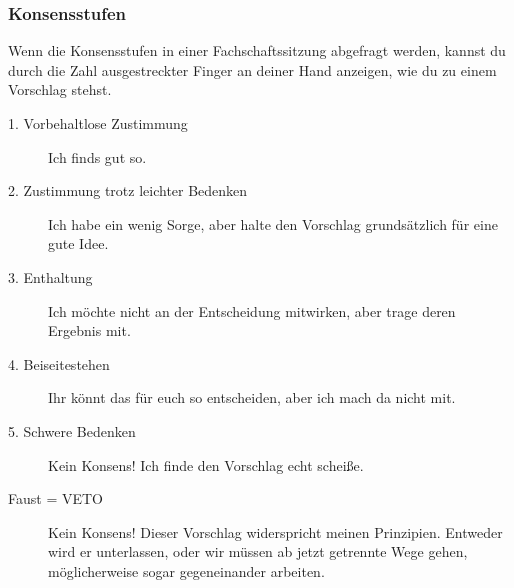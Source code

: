 \vspace*{-1em}

\subsubsection*{Konsensstufen}
\footnotesize
Wenn die Konsensstufen in einer Fachschaftssitzung abgefragt werden, kannst du durch die Zahl ausgestreckter Finger an deiner Hand anzeigen, wie du zu einem Vorschlag stehst.
\begin{description}
\item[1. Vorbehaltlose Zustimmung] Ich finds gut so.
\item[2. Zustimmung trotz leichter Bedenken] Ich habe ein wenig Sorge, aber halte den Vorschlag grundsätzlich für eine gute Idee.
\item[3. Enthaltung] Ich möchte nicht an der Entscheidung mitwirken, aber trage deren Ergebnis mit.
\item[4. Beiseitestehen] Ihr könnt das für euch so entscheiden, aber ich mach da nicht mit.
\item[5. Schwere Bedenken] Kein Konsens! Ich finde den Vorschlag echt scheiße.
\item[Faust = VETO] Kein Konsens! Dieser Vorschlag widerspricht meinen Prinzipien. Entweder wird er unterlassen, oder wir müssen ab jetzt getrennte Wege gehen, möglicherweise sogar gegeneinander arbeiten.
\end{description}

